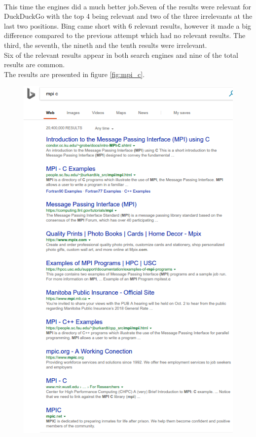 \documentclass{article}
\begin{document}
\\This time the engines did a much better job.Seven of the results were relevant for DuckDuckGo with the top 4 being relevant and two of the three irrelevants at the last two positions. Bing came short with 6 relevant results, however it made a big difference compared to the previous attempt which had no relevant results. The third, the seventh, the nineth and the tenth results were irrelevant.\\
Six of the relevant results appear in both search engines and nine of the total results are common.\\
The results are presented in figure \ref{fig:mpi_c}.
\begin{figure}
	\includegraphics[scale=0.5]{bing_mpi_c.png}

\end{figure}
\end{document}
